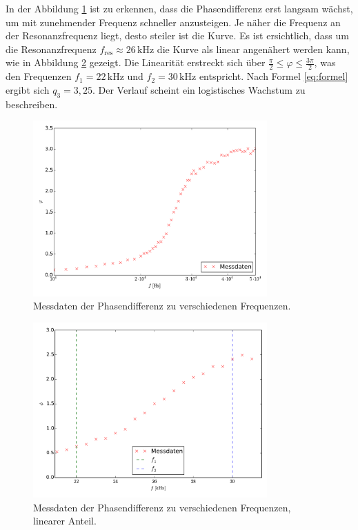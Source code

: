 In der Abbildung \ref{fig:phase} ist zu erkennen, dass die Phasendifferenz erst langsam wächst, um mit zunehmender Frequenz schneller anzusteigen. 
Je näher die Frequenz an der Resonanzfrequenz liegt, desto steiler ist die Kurve. 
Es ist ersichtlich, dass um die Resonanzfrequenz  $f_\mathup{res}\approx26\,\si{\kilo\hertz}$ die Kurve als linear angenähert werden kann, wie in Abbildung \ref{fig:phase_lin} gezeigt. 
Die Linearität erstreckt sich über $\frac{\pi}{2}\leq\varphi\leq\frac{3\pi}{2}$, was den Frequenzen $f_1=22\,\si{\kilo\hertz}$ und $f_2=30\,\si{\kilo\hertz}$ entspricht. 
Nach Formel \eqref{eq:formel} ergibt sich $q_3=3,25$.
Der Verlauf scheint ein logistisches Wachstum zu beschreiben.
\begin{figure}[h]
		\centering
		\includegraphics[width=0.8\textwidth]{build/plot_phase.pdf}
		\caption{Messdaten der Phasendifferenz zu verschiedenen Frequenzen. \cite{matplotlib}}
\label{fig:phase}
\end{figure}
\begin{figure}[h]
		\centering
		\includegraphics[width=0.8\textwidth]{build/plot_phase_linear.pdf}
		\caption{Messdaten der Phasendifferenz zu verschiedenen Frequenzen, linearer Anteil. \cite{matplotlib}}
\label{fig:phase_lin}
\end{figure}
